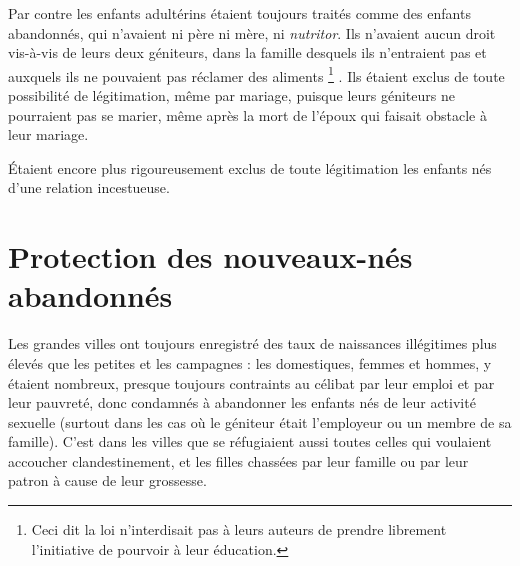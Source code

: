  Par contre les enfants adultérins étaient toujours traités comme des enfants abandonnés, qui n'avaient ni père ni mère, ni \emph{nutritor}. Ils n'avaient aucun droit vis-à-vis de leurs deux géniteurs, dans la famille desquels ils n'entraient pas et auxquels ils ne pouvaient pas réclamer des aliments%
\footnote{Ceci dit la loi n'interdisait pas à leurs auteurs de prendre librement l'initiative de pourvoir à leur éducation.}%
. Ils étaient exclus de toute possibilité de légitimation, même par mariage, puisque leurs géniteurs ne pourraient pas se marier, même après la mort de l'époux qui faisait obstacle à leur mariage. 

 Étaient encore plus rigoureusement exclus de toute légitimation les enfants nés d'une relation incestueuse.


\section{Protection des nouveaux-nés abandonnés}

 Les grandes villes ont toujours enregistré des taux de naissances illégitimes plus élevés que les petites et les campagnes : les domestiques, femmes et hommes, y étaient nombreux, presque toujours contraints au célibat par leur emploi et par leur pauvreté, donc condamnés à abandonner les enfants nés de leur activité sexuelle (surtout dans les cas où le géniteur était l'employeur ou un membre de sa famille). C'est dans les villes que se réfugiaient aussi toutes celles qui voulaient accoucher clandestinement, et les filles chassées par leur famille ou par leur patron à cause de leur grossesse.

